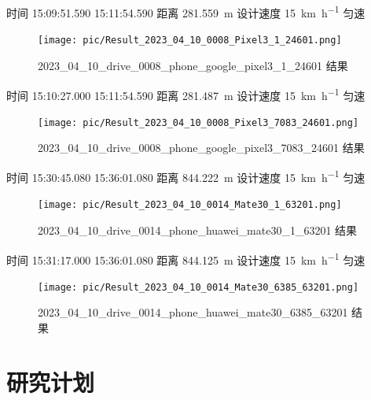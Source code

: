 \documentclass{beamer} %
\begin{document}
\begin{frame}
    时间 15:09:51.590  15:11:54.590 距离 \qty{281.559}{\meter}
    设计速度 \qty{15}{\km\per\hour} 匀速
    \begin{figure}[htbp]
        \centering
        \texttt{[image: pic/Result\_2023\_04\_10\_0008\_Pixel3\_1\_24601.png]}
        \caption{2023\_04\_10\_drive\_0008\_phone\_google\_pixel3\_1\_24601 结果}
        \label{fig:transformer-arc}
    \end{figure}
\end{frame}

\begin{frame}
    时间 15:10:27.000  15:11:54.590 距离 \qty{281.487}{\meter}
    设计速度 \qty{15}{\km\per\hour} 匀速
    \begin{figure}[htbp]
        \centering
        \texttt{[image: pic/Result\_2023\_04\_10\_0008\_Pixel3\_7083\_24601.png]}
        \caption{2023\_04\_10\_drive\_0008\_phone\_google\_pixel3\_7083\_24601 结果}
        \label{fig:transformer-arc}
    \end{figure}
\end{frame}



\begin{frame}
    时间 15:30:45.080  15:36:01.080 距离 \qty{844.222}{\meter}
    设计速度 \qty{15}{\km\per\hour} 匀速
    \begin{figure}[htbp]
        \centering
        \texttt{[image: pic/Result\_2023\_04\_10\_0014\_Mate30\_1\_63201.png]}
        \caption{2023\_04\_10\_drive\_0014\_phone\_huawei\_mate30\_1\_63201 结果}
        \label{fig:transformer-arc}
    \end{figure}
\end{frame}

\begin{frame}
    时间 15:31:17.000  15:36:01.080 距离 \qty{844.125}{\meter}
    设计速度 \qty{15}{\km\per\hour} 匀速
    \begin{figure}[htbp]
        \centering
        \texttt{[image: pic/Result\_2023\_04\_10\_0014\_Mate30\_6385\_63201.png]}
        \caption{2023\_04\_10\_drive\_0014\_phone\_huawei\_mate30\_6385\_63201 结果}
        \label{fig:transformer-arc}
    \end{figure}
\end{frame}

\section{研究计划}
\end{document}
